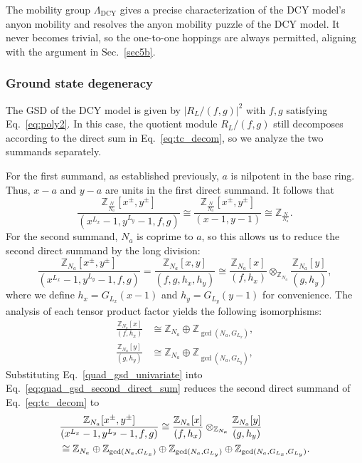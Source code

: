 \documentclass[aps,prb,english,superscriptaddress,twocolumn,tightenlines,showpacs,longbibliography,floatfix,amsfonts]{revtex4-2}
\begin{document}
The mobility group $\Lambda_{{\operatorname{DCY}}}$ gives a precise characterization of the DCY model's anyon mobility and resolves the anyon mobility puzzle of the DCY model. It never becomes trivial, so the one-to-one hoppings are always permitted, aligning with the argument in Sec.~\ref{sec5b}.

  
\subsubsection{Ground state degeneracy}

The GSD of the DCY model is given by $|R_L/(f,g)|^2$ with $f,g$ satisfying Eq.~\eqref{eq:poly2}. In this case, the quotient module $R_L/(f,g)$ still decomposes according to the direct sum in Eq.~\eqref{eq:tc_decom}, so we analyze the two summands separately.

For the first summand, as established previously, $a$ is nilpotent in the base ring. Thus, $x-a$ and $y-a$ are units in the first direct summand. It follows that
\begin{equation}
    \frac{\mathbb{Z}_{\frac{N}{N_a}}[x^{\pm},y^{\pm}]}{(x^{L_x}-1,y^{L_y}-1,f,g)}\cong \frac{\mathbb{Z}_{\frac{N}{N_a}}[x^{\pm},y^{\pm}]}{(x-1,y-1)}\cong\mathbb{Z}_{\frac{N}{N_a}}.\label{eq:quad_gsd_first_direct_sum}
\end{equation}
For the second summand, $N_a$ is coprime to $a$, so this allows us to reduce the second direct summand by the long division:
\begin{equation}
    \frac{\mathbb{Z}_{N_a}[x^{\pm},y^{\pm}]}{(x^{L_x}-1,y^{L_y}-1,f,g)}=\frac{\mathbb{Z}_{N_a}[x,y]}{(f,g,h_x,h_y)}\cong \frac{\mathbb{Z}_{N_a}[x]}{(f,h_x)}\otimes_{\mathbb{Z}_{N_a}}\frac{\mathbb{Z}_{N_a}[y]}{(g,h_y)},\label{eq:quad_gsd_second_direct_sum}
\end{equation}
where we define $h_x=G_{L_x}(x-1)$ and $h_y=G_{L_y}(y-1)$ for convenience. The analysis of each tensor product factor yields the following isomorphisms:
\begin{equation}
\begin{aligned}
    \frac{\mathbb{Z}_{N_a}[x]}{(f,h_x)}&\cong\mathbb{Z}_{N_a}\oplus\mathbb{Z}_{\gcd(N_a,G_{L_x})},\\
    \frac{\mathbb{Z}_{N_a}[y]}{(g,h_{y})}&\cong\mathbb{Z}_{N_a}\oplus\mathbb{Z}_{\gcd(N_a,G_{L_y})},\label{quad_gsd_univariate}
\end{aligned}
\end{equation}
Substituting Eq.~\eqref{quad_gsd_univariate} into Eq.~\eqref{eq:quad_gsd_second_direct_sum} reduces the second direct summand of Eq.~\eqref{eq:tc_decom} to
\begin{align}
    &\frac{\mathbb{Z}_{N_a}[x^{\pm},y^{\pm}]}{(x^{L_x}-1,y^{L_y}-1,f,g)}\cong \frac{\mathbb{Z}_{N_a}[x]}{(f,h_x)}\otimes_{\mathbb{Z}_{N_a}}\frac{\mathbb{Z}_{N_a}[y]}{(g,h_y)}\notag\\
    &\cong\mathbb{Z}_{N_a}\oplus\mathbb{Z}_{\gcd(N_a,G_{L_x})}\oplus\mathbb{Z}_{\gcd(N_a,G_{L_y})}\oplus\mathbb{Z}_{\gcd(N_a,G_{L_x},G_{L_y})}.
\end{align}
  
\end{document}
